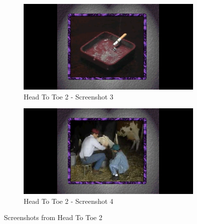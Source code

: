 \begin{figure}[H]
    \begin{subfigure}{0.45\textwidth}
        \centering
        \includegraphics[width=\linewidth]{Games/HeadtoToe/Images/HeadToToe2Image3.png}
        \caption{Head To Toe 2 - Screenshot 3}
    \end{subfigure}
    \begin{subfigure}{0.45\textwidth}
        \centering
        \includegraphics[width=\linewidth]{Games/HeadtoToe/Images/HeadToToe2Image4.png}
        \caption{Head To Toe 2 - Screenshot 4}
    \end{subfigure}
    \caption{Screenshots from Head To Toe 2}
\end{figure}